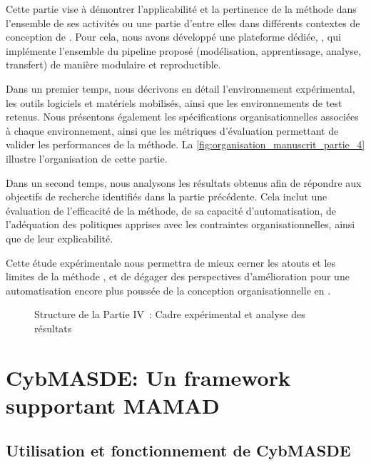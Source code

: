 \noindent
Cette partie vise à démontrer l'applicabilité et la pertinence de la méthode  dans l'ensemble de ses activités ou une partie d'entre elles dans différents contextes de conception de . Pour cela, nous avons développé une plateforme dédiée, , qui implémente l'ensemble du pipeline proposé (modélisation, apprentissage, analyse, transfert) de manière modulaire et reproductible.

\medskip

\noindent
Dans un premier temps, nous décrivons en détail l'environnement expérimental, les outils logiciels et matériels mobilisés, ainsi que les environnements de test retenus. Nous présentons également les spécifications organisationnelles associées à chaque environnement, ainsi que les métriques d'évaluation permettant de valider les performances de la méthode. La \autoref{fig:organisation_manuscrit_partie_4} illustre l'organisation de cette partie.

\medskip

\noindent
Dans un second temps, nous analysons les résultats obtenus afin de répondre aux objectifs de recherche identifiés dans la partie précédente. Cela inclut une évaluation de l'efficacité de la méthode, de sa capacité d'automatisation, de l'adéquation des politiques apprises avec les contraintes organisationnelles, ainsi que de leur explicabilité.

\medskip

\noindent
Cette étude expérimentale nous permettra de mieux cerner les atouts et les limites de la méthode , et de dégager des perspectives d'amélioration pour une automatisation encore plus poussée de la conception organisationnelle en .

\begin{figure}[h!]
  \centering
  \resizebox{0.7\linewidth}{!}{%
    
  }
  \caption{Structure de la Partie IV~: Cadre expérimental et analyse des résultats}
  \label{fig:organisation_manuscrit_partie_4}
\end{figure}

\clearpage
\thispagestyle{empty}
\null
\newpage

\chapter{CybMASDE: Un framework supportant MAMAD}
\label{sec:cybmasde}

\section*{Utilisation et fonctionnement de CybMASDE}\label{sec:cybmasde_cycle}

